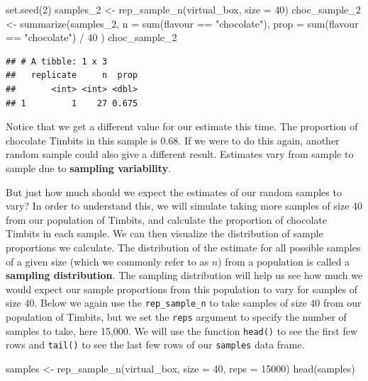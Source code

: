 \documentclass[
]{krantz}
\makeatletter
\newenvironment{Shaded}{\begin{snugshade}}{\end{snugshade}}
\newcommand{\AttributeTok}[1]{\textcolor[rgb]{0.61,0.61,0.61}{#1}}
\newcommand{\DecValTok}[1]{\textcolor[rgb]{0.06,0.06,0.06}{#1}}
\newcommand{\FunctionTok}[1]{\textcolor[rgb]{0,0,0}{#1}}
\newcommand{\NormalTok}[1]{#1}
\newcommand{\OtherTok}[1]{\textcolor[rgb]{0.37,0.37,0.37}{#1}}
\newcommand{\SpecialCharTok}[1]{\textcolor[rgb]{0,0,0}{#1}}
\newcommand{\StringTok}[1]{\textcolor[rgb]{0.5,0.5,0.5}{#1}}
\newenvironment{kframe}{%
\medskip{}
\setlength{\fboxsep}{.8em}
 \def\at@end@of@kframe{}%
 \ifinner\ifhmode%
  \def\at@end@of@kframe{\end{minipage}}%
  \begin{minipage}{\columnwidth}%
 \fi\fi%
 \def\FrameCommand##1{\hskip\@totalleftmargin \hskip-\fboxsep
 \colorbox{shadecolor}{##1}\hskip-\fboxsep
     \hskip-\linewidth \hskip-\@totalleftmargin \hskip\columnwidth}%
 \MakeFramed {\advance\hsize-\width
   \@totalleftmargin\z@ \linewidth\hsize
   \@setminipage}}%
 {\par\unskip\endMakeFramed%
 \at@end@of@kframe}
\renewenvironment{Shaded}{\begin{kframe}}{\end{kframe}}
\makeatother
\begin{document}
\begin{Shaded}
\begin{Highlighting}[]
\FunctionTok{set.seed}\NormalTok{(}\DecValTok{2}\NormalTok{)}
\NormalTok{samples\_2 }\OtherTok{\textless{}{-}} \FunctionTok{rep\_sample\_n}\NormalTok{(virtual\_box, }\AttributeTok{size =} \DecValTok{40}\NormalTok{)}
\NormalTok{choc\_sample\_2 }\OtherTok{\textless{}{-}} \FunctionTok{summarize}\NormalTok{(samples\_2,}
  \AttributeTok{n =} \FunctionTok{sum}\NormalTok{(flavour }\SpecialCharTok{==} \StringTok{"chocolate"}\NormalTok{),}
  \AttributeTok{prop =} \FunctionTok{sum}\NormalTok{(flavour }\SpecialCharTok{==} \StringTok{"chocolate"}\NormalTok{) }\SpecialCharTok{/} \DecValTok{40}
\NormalTok{)}
\NormalTok{choc\_sample\_2}
\end{Highlighting}
\end{Shaded}

\begin{verbatim}
## # A tibble: 1 x 3
##   replicate     n  prop
##       <int> <int> <dbl>
## 1         1    27 0.675
\end{verbatim}

Notice that we get a different value for our estimate this time. The
proportion of chocolate Timbits in this sample is 0.68.
If we were to do this again, another random sample could also give a
different result. Estimates vary from sample to sample
due to \textbf{sampling variability}.

But just how much should we expect the estimates of our random
samples to vary? In order to understand this, we will simulate taking more samples
of size 40 from our population of Timbits, and calculate the
proportion of chocolate Timbits in each sample. We can then
visualize the distribution of sample proportions we calculate. The distribution
of the estimate for all possible samples of a given size (which we commonly refer to as \(n\)) from a population is
called a \textbf{sampling distribution}. The sampling distribution will help us see
how much we would expect our sample proportions from this population to vary
for samples of size 40. Below we again use the \texttt{rep\_sample\_n} to take samples
of size 40 from our population of Timbits, but we set the \texttt{reps} argument
to specify the number of samples to take, here 15,000. We will use the function \texttt{head()} to see the first few rows and \texttt{tail()} to see the last few rows of our \texttt{samples} data frame.

\begin{Shaded}
\begin{Highlighting}[]
\NormalTok{samples }\OtherTok{\textless{}{-}} \FunctionTok{rep\_sample\_n}\NormalTok{(virtual\_box, }\AttributeTok{size =} \DecValTok{40}\NormalTok{, }\AttributeTok{reps =} \DecValTok{15000}\NormalTok{)}
\FunctionTok{head}\NormalTok{(samples)}
\end{Highlighting}
\end{Shaded}
\end{document}
